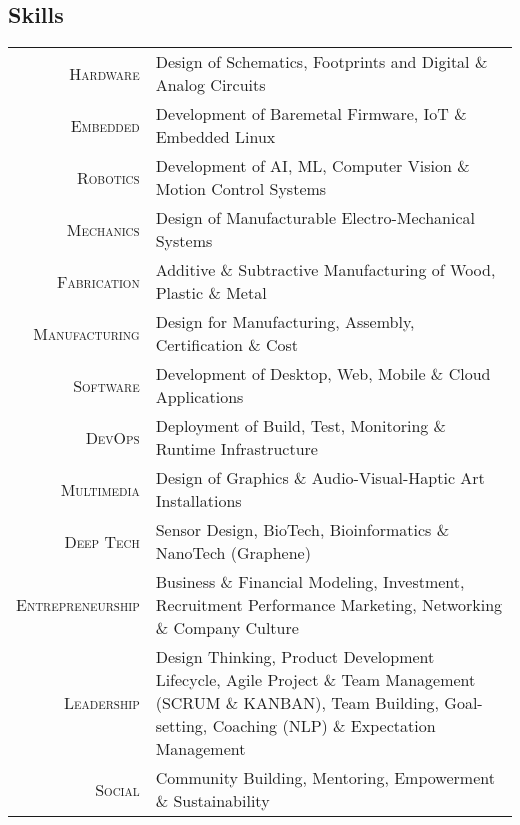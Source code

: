 \subsection{Skills}
\begin{longtable}
		{r|p{13cm}}
		\textsc{Hardware} & Design of Schematics, Footprints and Digital \& Analog Circuits\\
		\textsc{Embedded} & Development of Baremetal Firmware, IoT \& Embedded Linux\\
		\textsc{Robotics} & Development of AI, ML, Computer Vision \& Motion Control Systems\\
		\textsc{Mechanics} & Design of Manufacturable Electro-Mechanical Systems\\
		\textsc{Fabrication} & Additive \& Subtractive Manufacturing of Wood, Plastic \& Metal\\
		\textsc{Manufacturing} & Design for Manufacturing, Assembly, Certification \& Cost\\
		\textsc{Software} & Development of Desktop, Web, Mobile \& Cloud Applications\\
		\textsc{DevOps} & Deployment of Build, Test, Monitoring \& Runtime Infrastructure\\
		\textsc{Multimedia} & Design of Graphics \& Audio-Visual-Haptic Art Installations\\
		\textsc{Deep Tech} & Sensor Design, BioTech, Bioinformatics \& NanoTech (Graphene)\\
		\textsc{Entrepreneurship} & Business \& Financial Modeling, Investment, Recruitment \newline Performance Marketing, Networking \& Company Culture\\
		\textsc{Leadership} & Design Thinking, Product Development Lifecycle, Agile Project \newline \& Team Management (SCRUM \& KANBAN), Team Building, \newline Goal-setting, Coaching (NLP) \& Expectation Management\\
		\textsc{Social} & Community Building, Mentoring, Empowerment \& Sustainability\\
\end{longtable}
